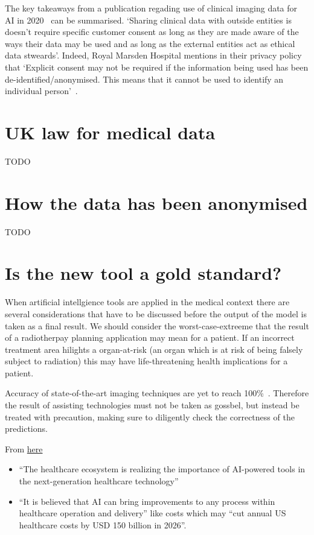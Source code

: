 \documentclass[11pt]{article}
\begin{document}
The key takeaways from a publication regading use of clinical imaging data for AI in 2020~\cite{ethics-imaging-AI} can be summarised. `Sharing clinical data with outside entities is doesn't require specific customer consent as long as they are made aware of the ways their data may be used and as long as the external entities act as ethical data stweards'. Indeed, Royal Marsden Hospital mentions in their privacy policy that `Explicit consent may not be required if the information being used has been de-identified/anonymised. This means that it cannot be used to identify an individual person'~\cite{royal-marsden-privacy-note}.

\section{UK law for medical data}

TODO

\section{How the data has been anonymised}

TODO

\section{Is the new tool a gold standard?}

When artificial intellgience tools are applied in the medical context there are several considerations that have to be discussed before the output of the model is taken as a final result. We should consider the worst-case-extreeme that the result of a radiotherpay planning application may mean for a patient. If an incorrect treatment area hilights a organ-at-risk (an organ which is at risk of being falsely subject to radiation) this may have life-threatening health implications for a patient. 

Accuracy of state-of-the-art imaging techniques are yet to reach 100\%~\cite{}. Therefore the result of assisting technologies must not be taken as gossbel, but instead be treated with precaution, making sure to diligently check the correctness of the predictions.

\vspace{1em}

From \href{https://www.ncbi.nlm.nih.gov/pmc/articles/PMC7325854/pdf/main.pdf}{here}~\cite{rise-of-ai-in-healthcare}

\begin{itemize}
    \item ``The healthcare ecosystem is realizing the importance of AI-powered tools in the next-generation healthcare technology''
    \item ``It is believed that AI can bring improvements to any process within healthcare operation and delivery'' like costs which may ``cut annual US healthcare costs by USD 150 billion in 2026''.
\end{itemize}
\end{document}
